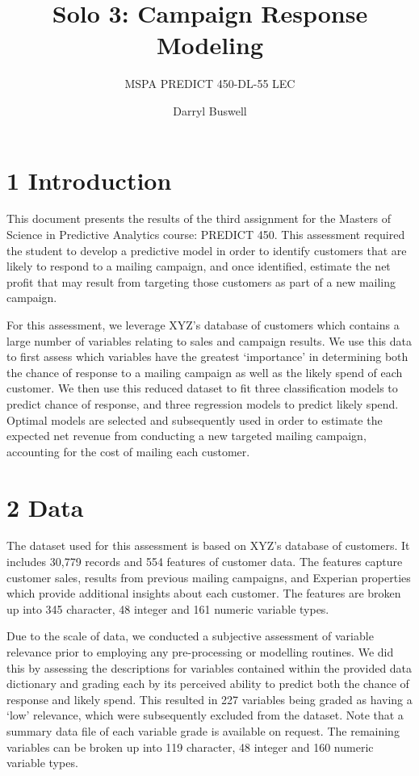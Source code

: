 \documentclass[]{article}
\title{Solo 3: Campaign Response Modeling}
\subtitle{MSPA PREDICT 450-DL-55 LEC}
\author{Darryl Buswell}
\date{}
\begin{document}
\maketitle

\section{1 Introduction}\label{introduction}

This document presents the results of the third assignment for the
Masters of Science in Predictive Analytics course: PREDICT 450. This
assessment required the student to develop a predictive model in order
to identify customers that are likely to respond to a mailing campaign,
and once identified, estimate the net profit that may result from
targeting those customers as part of a new mailing campaign.

For this assessment, we leverage XYZ's database of customers which
contains a large number of variables relating to sales and campaign
results. We use this data to first assess which variables have the
greatest `importance' in determining both the chance of response to a
mailing campaign as well as the likely spend of each customer. We then
use this reduced dataset to fit three classification models to predict
chance of response, and three regression models to predict likely spend.
Optimal models are selected and subsequently used in order to estimate
the expected net revenue from conducting a new targeted mailing
campaign, accounting for the cost of mailing each customer.

\section{2 Data}\label{data}

The dataset used for this assessment is based on XYZ's database of
customers. It includes 30,779 records and 554 features of customer data.
The features capture customer sales, results from previous mailing
campaigns, and Experian properties which provide additional insights
about each customer. The features are broken up into 345 character, 48
integer and 161 numeric variable types.

Due to the scale of data, we conducted a subjective assessment of
variable relevance prior to employing any pre-processing or modelling
routines. We did this by assessing the descriptions for variables
contained within the provided data dictionary and grading each by its
perceived ability to predict both the chance of response and likely
spend. This resulted in 227 variables being graded as having a `low'
relevance, which were subsequently excluded from the dataset. Note that
a summary data file of each variable grade is available on request. The
remaining variables can be broken up into 119 character, 48 integer and
160 numeric variable types.
\end{document}

